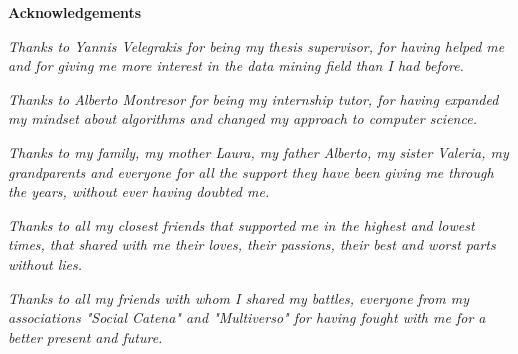 \thispagestyle{empty}

\begin{center}
  {\bf \Huge Acknowledgements}
\end{center}

\vspace{4cm}


\emph{Thanks to Yannis Velegrakis for being my thesis supervisor, for having helped me and for giving me more interest in the data mining field than I had before.}


\emph{Thanks to Alberto Montresor for being my internship tutor, for having expanded my mindset about algorithms and changed my approach to computer science.}


\emph{Thanks to my family, my mother Laura, my father Alberto, my sister Valeria, my grandparents and everyone for all the support they have been giving me through the years, without ever having doubted me.}


\emph{Thanks to all my closest friends that supported me in the highest and lowest times, that shared with me their loves, their passions, their best and worst parts without lies.}


\emph{Thanks to all my friends with whom I shared my battles, everyone from my associations "Social Catena" and "Multiverso" for having fought with me for a better present and future.
}
